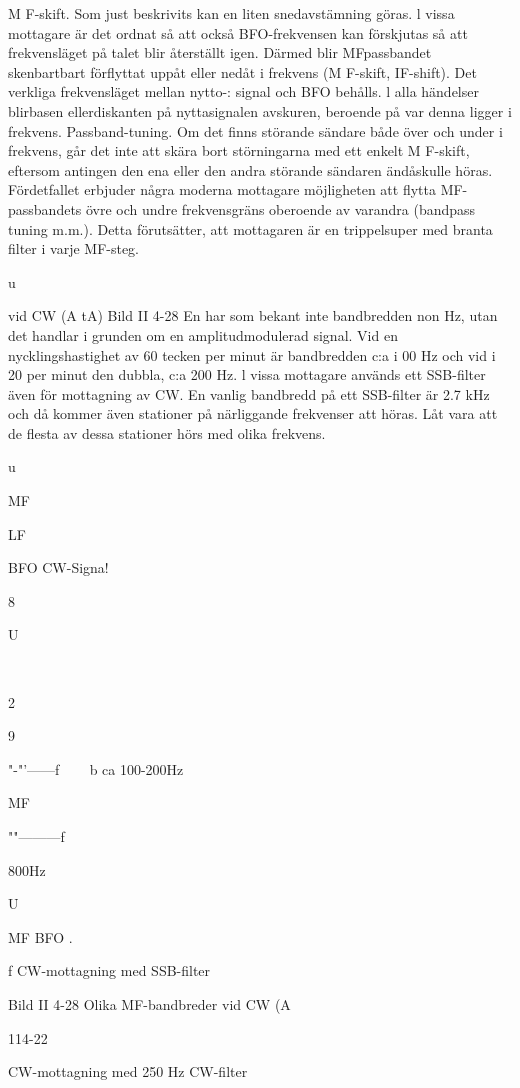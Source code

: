 M F-skift. Som just beskrivits kan en liten
snedavstämning göras. l vissa mottagare
är det ordnat så att också BFO-frekvensen kan förskjutas så att frekvensläget på
talet blir återställt igen. Därmed blir MFpassbandet skenbartbart förflyttat uppåt
eller nedåt i frekvens (M F-skift, IF-shift).
Det verkliga frekvensläget mellan nytto-:
signal och BFO behålls. l alla händelser
blirbasen ellerdiskanten på nyttasignalen
avskuren, beroende på var denna ligger
i frekvens.
Passband-tuning. Om det finns störande
sändare både över och under i frekvens,
går det inte att skära bort störningarna
med ett enkelt M F-skift, eftersom antingen den ena eller den andra störande
sändaren ändåskulle höras. Fördetfallet
erbjuder några moderna mottagare möjligheten att flytta MF-passbandets övre
och undre frekvensgräns oberoende av
varandra (bandpass tuning m.m.). Detta
förutsätter, att mottagaren är en trippelsuper med branta filter i varje MF-steg.

u

vid CW (A tA)
Bild II 4-28
En
har som bekant inte bandbredden non Hz, utan det handlar i grunden
om en amplitudmodulerad signal. Vid en
nycklingshastighet av 60 tecken per minut
är bandbredden c:a i 00 Hz och vid i 20
per minut den dubbla, c:a 200 Hz.
l vissa mottagare används ett SSB-filter
även för mottagning av CW. En vanlig bandbredd på ett SSB-filter är 2.7 kHz och då
kommer även stationer på närliggande frekvenser att höras. Låt vara att de flesta av
dessa stationer hörs med olika frekvens.

u

MF

LF

BFO
CW-Signa!

8

U

~~~

2

9

"-"'------f
~~~ b ca 100-200Hz

MF

""---------f

800Hz

U

MF
BFO .

f
CW-mottagning med SSB-filter

Bild II 4-28 Olika MF-bandbreder vid CW (A

114-22

CW-mottagning med 250 Hz CW-filter

